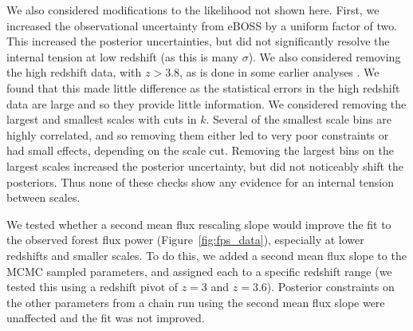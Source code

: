 We also considered modifications to the likelihood not shown here.
First, we increased the observational uncertainty from eBOSS by a uniform factor of two.
This increased the posterior uncertainties, but did not significantly resolve the internal tension at low redshift (as this is many $\sigma$).
We also considered removing the high redshift data, with $z > 3.8$, as is done in some earlier analyses \cite{2011MNRAS.413.1717B}.
We found that this made little difference as the statistical errors in the high redshift data are large and so they provide little information. 
We considered removing the largest and smallest scales with cuts in $k$.
Several of the smallest scale bins are highly correlated, and so removing them either led to very poor constraints or had small effects, depending on the scale cut.
Removing the largest bins on the largest scales increased the posterior uncertainty, but did not noticeably shift the posteriors.
Thus none of these checks show any evidence for an internal tension between scales.

We tested whether a second mean flux rescaling slope would improve the fit to the observed \lya forest flux power (Figure~\ref{fig:fps_data}), especially at lower redshifts and smaller scales.
To do this, we added a second mean flux slope to the MCMC sampled parameters, and assigned each to a specific redshift range (we tested this using a redshift pivot of $z=3$ and $z=3.6$).
Posterior constraints on the other parameters from a chain run using the second mean flux slope were unaffected and the fit was not improved.
